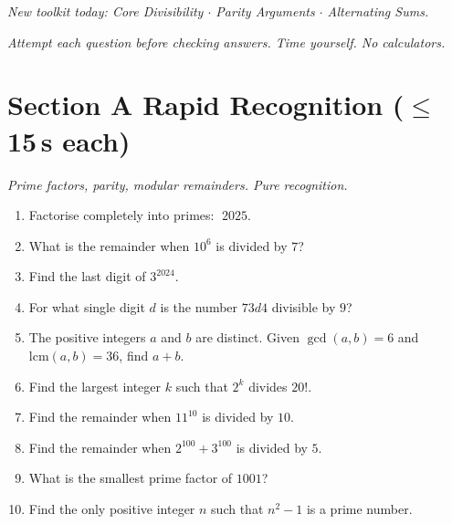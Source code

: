 \documentclass[11pt,a4paper]{article}
\begin{document}
\noindent\textit{New toolkit today: Core Divisibility $\cdot$ Parity Arguments $\cdot$ Alternating Sums.}

\vspace{2pt}
\noindent\textit{Attempt each question before checking answers. Time yourself. No calculators.}

\section*{Section A \quad Rapid Recognition \hfill{\normalfont\small($\leq$15\,s each)}}

\noindent\textit{Prime factors, parity, modular remainders. Pure recognition.}

\begin{enumerate}

\item Factorise completely into primes: $\;2025$.

\item What is the remainder when $10^6$ is divided by $7$?

\item Find the last digit of $3^{2024}$.

\item For what single digit $d$ is the number $73d4$ divisible by $9$?

\item The positive integers $a$ and $b$ are distinct. Given $\gcd(a,b)=6$ and $\text{lcm}(a,b)=36$, find $a+b$.

\item Find the largest integer $k$ such that $2^k$ divides $20!$.

\item Find the remainder when $11^{10}$ is divided by $10$.

\item Find the remainder when $2^{100} + 3^{100}$ is divided by $5$.

\item What is the smallest prime factor of $1001$?

\item Find the only positive integer $n$ such that $n^2 - 1$ is a prime number.

\end{enumerate}
\end{document}
